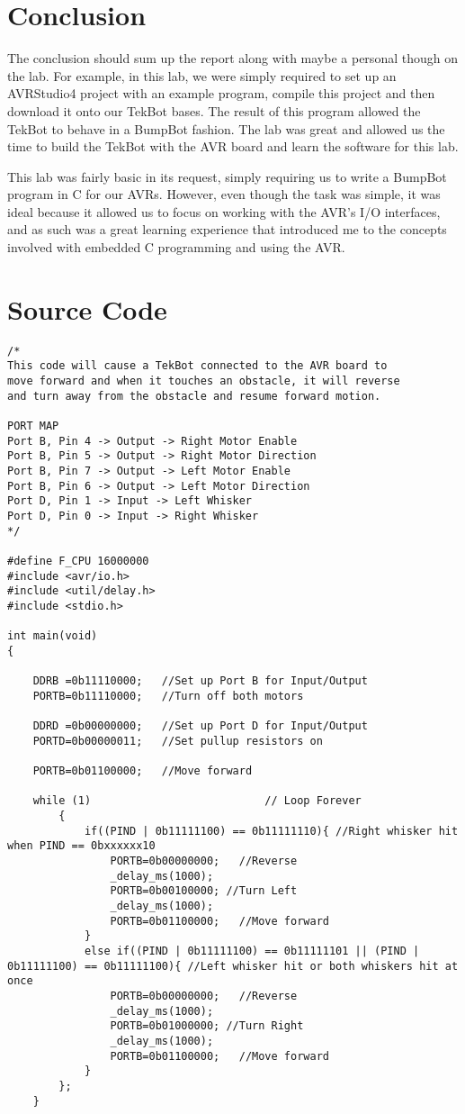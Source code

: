 \documentclass[12pt,letterpaper]{article}
\begin{document}
\section{Conclusion}

The conclusion should sum up the report along with maybe a personal though on
the lab.  For example, in this lab, we were simply required to set up an
AVRStudio4 project with an example program, compile this project and then
download it onto our TekBot bases.  The result of this program allowed the
TekBot to behave in a BumpBot fashion.  The lab was great and allowed us the
time to build the TekBot with the AVR board and learn the software for this
lab.

This lab was fairly basic in its request, simply requiring us to write a
BumpBot program in C for our AVRs.  However, even though the task was simple,
it was ideal because it allowed us to focus on working with the AVR's I/O
interfaces, and as such was a great learning experience that introduced me to
the concepts involved with embedded C programming and using the AVR.

\section{Source Code}

\begin{verbatim}
/*
This code will cause a TekBot connected to the AVR board to
move forward and when it touches an obstacle, it will reverse
and turn away from the obstacle and resume forward motion.

PORT MAP
Port B, Pin 4 -> Output -> Right Motor Enable
Port B, Pin 5 -> Output -> Right Motor Direction
Port B, Pin 7 -> Output -> Left Motor Enable
Port B, Pin 6 -> Output -> Left Motor Direction
Port D, Pin 1 -> Input -> Left Whisker
Port D, Pin 0 -> Input -> Right Whisker
*/

#define F_CPU 16000000
#include <avr/io.h>
#include <util/delay.h>
#include <stdio.h>

int main(void)
{

    DDRB =0b11110000;   //Set up Port B for Input/Output
    PORTB=0b11110000;   //Turn off both motors

    DDRD =0b00000000;   //Set up Port D for Input/Output
    PORTD=0b00000011;   //Set pullup resistors on

    PORTB=0b01100000;   //Move forward
    
    while (1)                           // Loop Forever
        {
            if((PIND | 0b11111100) == 0b11111110){ //Right whisker hit when PIND == 0bxxxxxx10
                PORTB=0b00000000;   //Reverse
                _delay_ms(1000);
                PORTB=0b00100000; //Turn Left
                _delay_ms(1000);
                PORTB=0b01100000;   //Move forward
            }
            else if((PIND | 0b11111100) == 0b11111101 || (PIND | 0b11111100) == 0b11111100){ //Left whisker hit or both whiskers hit at once
                PORTB=0b00000000;   //Reverse
                _delay_ms(1000);
                PORTB=0b01000000; //Turn Right
                _delay_ms(1000);
                PORTB=0b01100000;   //Move forward
            }
        };
    }
\end{verbatim}
\end{document}
